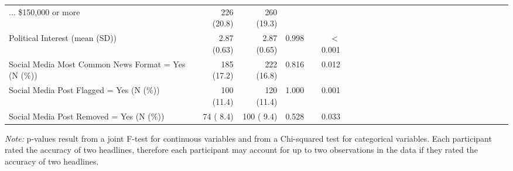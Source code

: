 \begin{table}[!htbp]
{\begin{threeparttable}
\begin{tabular}[t]{l|r|r|r|rl|r|r|r|rl|r|r|r|rl|r|r|r|rl|r|r|r|r}
... \$150,000 or more & 226 (20.8) & 260 (19.3) &  & \\
Political Interest (mean (SD)) & 2.87 (0.63) & 2.87 (0.65) & 0.998 & $<$0.001\\
Social Media Most Common News Format = Yes (N (\%)) & 185 (17.2) & 222 (16.8) & 0.816 & 0.012\\
Social Media Post Flagged = Yes (N (\%)) & 100 (11.4) & 120 (11.4) & 1.000 & 0.001\\
Social Media Post Removed = Yes (N (\%)) & 74 ( 8.4) & 100 ( 9.4) & 0.528 & 0.033\\
\bottomrule
\end{tabular}
\begin{tablenotes}
\item \small{\textit{Note:} p-values result from a joint F-test for continuous variables and from a Chi-squared test for categorical variables. Each participant rated the accuracy of two headlines, therefore each participant may account for up to two observations in the data if they rated the accuracy of two headlines.}
\end{tablenotes}
\end{threeparttable}}
\end{table}